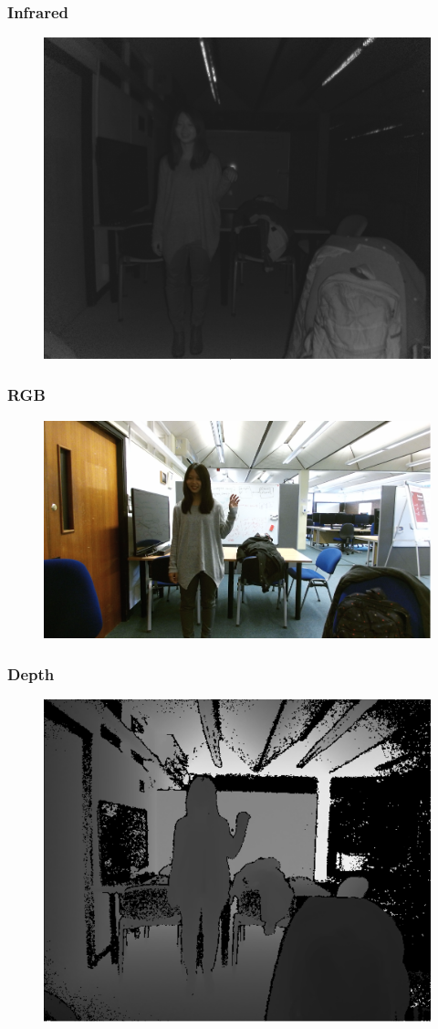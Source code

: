 \documentclass{beamer}
\begin{document}
\begin{frame}
\frametitle{Infrared}
\begin{figure}
\includegraphics[width=0.7\linewidth]{infrared}
\end{figure}
\end{frame}

\begin{frame}
\frametitle{RGB}
\begin{figure}
\includegraphics[width=0.7\linewidth]{color}
\end{figure}
\end{frame}

\begin{frame}
\frametitle{Depth}
\begin{figure}
\includegraphics[width=0.7\linewidth]{depth}
\end{figure}
\end{frame}
\end{document}
